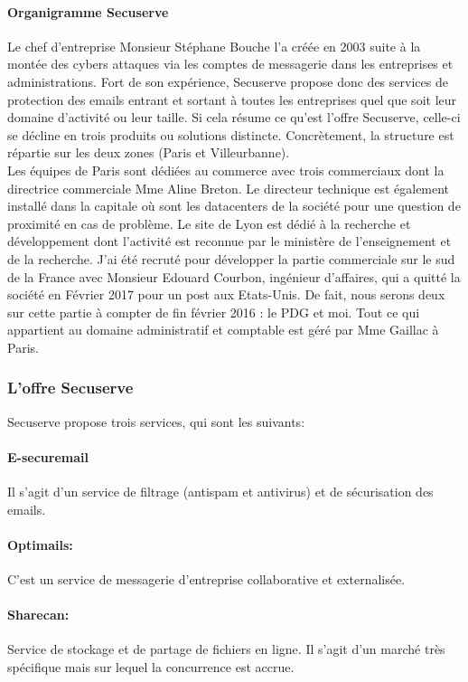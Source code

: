 \paragraph{Organigramme Secuserve}
Le chef d’entreprise Monsieur Stéphane Bouche l’a créée en 2003 suite à la montée des cybers attaques via les comptes de messagerie dans les entreprises et administrations. Fort de son expérience, Secuserve propose donc des services de protection des emails entrant et sortant à toutes les entreprises quel que soit leur domaine d’activité ou leur taille. Si cela résume ce qu’est l’offre Secuserve, celle-ci se décline en trois produits ou solutions distincte.
Concrètement, la structure est répartie sur les deux zones (Paris et Villeurbanne).\\
Les équipes de Paris sont dédiées au commerce avec trois commerciaux dont la directrice commerciale Mme Aline Breton. Le directeur technique est également installé dans la capitale où sont les datacenters de la société pour une question de proximité en cas de problème. Le site de Lyon est dédié à la recherche et développement dont l’activité est reconnue par le ministère de l’enseignement et de la recherche. J’ai été recruté pour développer la partie commerciale sur le sud de la France avec Monsieur Edouard Courbon, ingénieur d’affaires,  qui a quitté la société en Février 2017 pour un post aux Etats-Unis. De fait, nous serons deux sur cette partie à compter de fin février 2016 : le PDG et moi.
Tout ce qui appartient au domaine administratif et comptable est géré par Mme Gaillac à Paris.

\subsubsection{L’offre Secuserve}
Secuserve propose trois services, qui sont les suivants:
\paragraph{E-securemail}
Il s’agit d’un service de filtrage (antispam et antivirus) et de sécurisation des emails.
\paragraph{Optimails:} C’est un service de messagerie d’entreprise collaborative et externalisée.
\paragraph{Sharecan:}Service de stockage et de partage de fichiers en ligne.
Il s’agit d’un marché très spécifique mais sur lequel la concurrence est accrue.

